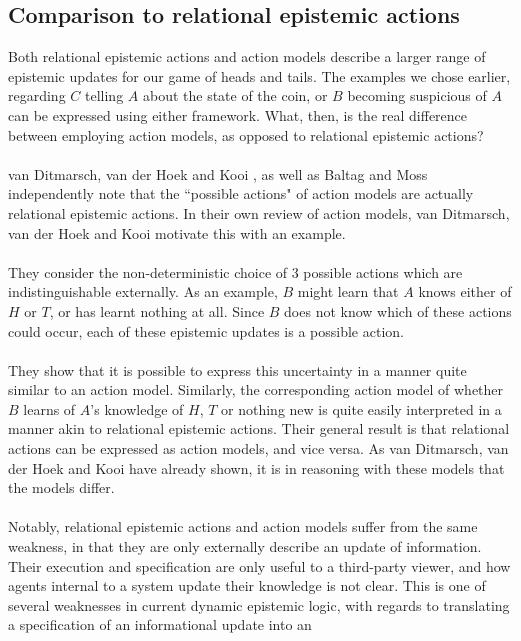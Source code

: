 \subsection{Comparison to relational epistemic actions} \label{epi_compare}
Both relational epistemic actions \cite{hoek2008dynamic} and action models
\cite{baltag1998lpa} describe a larger range of epistemic updates for our game of heads and tails.
The examples we chose earlier, regarding $C$ telling $A$ about the state of the
coin, or $B$ becoming suspicious of $A$ can be expressed using either framework.
What, then, is the real difference between employing action models, as opposed
to relational epistemic actions?\\
\\
van Ditmarsch, van der Hoek and Kooi \cite{hoek2008dynamic}, as well as Baltag and Moss
\cite{baltag2005programs} independently
note that the ``possible actions" of action models  are actually relational
epistemic actions.
In their own review of action models, van Ditmarsch, van der Hoek and Kooi
motivate this with an example.\\
\\
They consider the non-deterministic choice of 3 possible actions which are
indistinguishable externally.
As an example, $B$ might learn that $A$ knows either of $H$ or $T$, or has
learnt nothing at all.
Since $B$ does not know which of these actions could occur, each of these
epistemic updates is a possible action.\\
\\
They show that it is possible to express this uncertainty in a manner quite similar
to an action model.
Similarly, the corresponding action model of whether $B$ learns of $A$'s
knowledge of $H$, $T$ or nothing new is quite easily interpreted in a manner
akin to relational epistemic actions.
Their general result is that relational actions can be expressed as action
models, and vice versa.
As van Ditmarsch, van der Hoek and Kooi have already shown, it is in reasoning
with these models that the models differ.\\
\\
Notably, relational epistemic actions and action models suffer from the same
weakness, in that they are only externally describe an update of information.
Their execution and specification are only useful to a third-party viewer, and
how agents internal to a system update their knowledge is not clear.
This is one of several weaknesses in current dynamic epistemic logic, with
regards to translating a specification of an informational update into an
